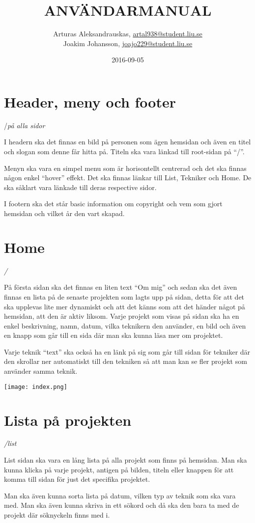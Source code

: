 \documentclass{TDP003mall}
\author{Arturas Aleksandrauskas, \url{artal938@student.liu.se}\\
  Joakim Johansson, \url{joajo229@student.liu.se}}
\title{ANVÄNDARMANUAL}
\date{2016-09-05}
\begin{document}
\projectpage


\section{Header, meny och footer}
/\textit{på alla sidor}

I headern ska det finnas en bild på personen som ägen hemsidan och även en titel och slogan som denne får hitta på. Titeln ska vara länkad till root-sidan på ``/''. 

Menyn ska vara en simpel menu som är horisontellt centrerad och det ska finnas någon enkel ``hover'' effekt. Det ska finnas länkar till List, Tekniker och Home. De ska såklart vara länkade till deras respective sidor.

I footern ska det står basic information om copyright och vem som gjort hemsidan och vilket år den vart skapad.


\section{Home}
\textit{/}

På första sidan ska det finnas en liten text ``Om mig'' och sedan ska det även finnas en lista på de senaste projekten som lagts upp på sidan, detta för att det ska upplevas lite mer dynamiskt och att det känns som att det händer något på hemsidan, att den är aktiv liksom. Varje projekt som visas på sidan ska ha en enkel beskrivning, namn, datum, vilka teknikern den använder, en bild och även en knapp som går till en sida där man ska kunna läsa mer om projektet.

Varje teknik ``text''  ska också ha en länk på sig som går till sidan för tekniker där den skrollar ner automatiskt till den tekniken så att man kan se fler projekt som använder samma teknik.

\texttt{[image: index.png]}

\section{Lista på projekten}
\textit{/list}

List sidan ska vara en lång lista på alla projekt som finns på hemsidan. Man ska kunna klicka på varje projekt, antigen på bilden, titeln eller knappen för att komma till sidan för just det specifika projektet.

Man ska även kunna sorta lista på datum, vilken typ av teknik som ska vara med. Man ska även kunna skriva in ett sökord och då ska den bara ta med de projekt där söknyckeln finns med i.
\end{document}
